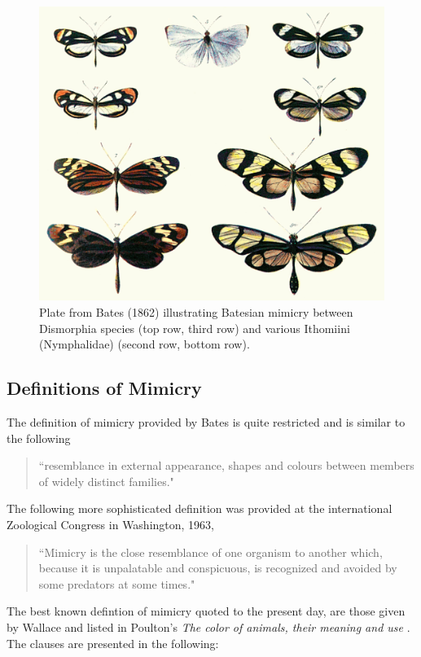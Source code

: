 \begin{figure}[H]
	\centering
	\includegraphics[scale=1]{images/Batesplate_ArM}
	\caption{Plate from Bates (1862) illustrating Batesian mimicry between Dismorphia species (top row, third row) and various Ithomiini (Nymphalidae) (second row, bottom row). \cite{bates1862}}
	\label{fig:batesian-butterfly}
\end{figure}

\subsection{Definitions of Mimicry}
The definition of mimicry provided by Bates is quite restricted and is similar to the following

\begin{quote}
``resemblance in external appearance, shapes and colours between members of widely distinct families."
\end{quote}

The following more sophisticated definition was provided at the international Zoological Congress in Washington, 1963,

\begin{quote}
``Mimicry is the close resemblance of one organism to another which, because it is unpalatable and conspicuous, is recognized and avoided by some predators at some times."
\end{quote}

The best known defintion of mimicry quoted to the present day, are those given by Wallace and listed in Poulton's \textit{The color of animals, their meaning and use} \cite{poulton1890colours}. The clauses are presented in the following:

